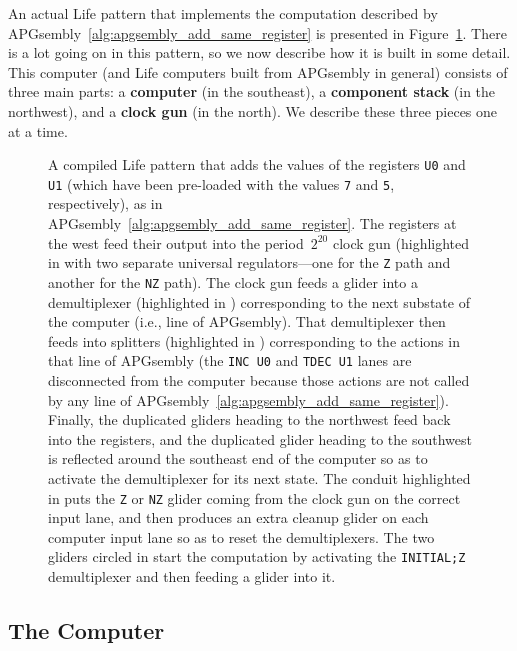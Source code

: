 An actual Life pattern that implements the computation described by APGsembly~\ref{alg:apgsembly_add_same_register} is presented in Figure~\ref{fig:add_computer}. There is a lot going on in this pattern, so we now describe how it is built in some detail. This computer (and Life computers built from APGsembly in general) consists of three main parts: a \textbf{computer} (in the southeast), a \textbf{component stack} (in the northwest), and a \textbf{clock gun} (in the north). We describe these three pieces one at a time.

\begin{figure}[!htb]
	\centering
	\caption{A compiled Life pattern that adds the values of the registers \texttt{U0} and \texttt{U1} (which have been pre-loaded with the values \texttt{7} and \texttt{5}, respectively), as in APGsembly~\ref{alg:apgsembly_add_same_register}. The registers at the west feed their output into the period~$2^{20}$ clock gun (highlighted in  with two separate universal regulators---one for the \texttt{Z} path and another for the \texttt{NZ} path). The clock gun feeds a glider into a demultiplexer (highlighted in ) corresponding to the next substate of the computer (i.e., line of APGsembly). That demultiplexer then feeds into splitters (highlighted in ) corresponding to the actions in that line of APGsembly (the \texttt{INC U0} and \texttt{TDEC U1} lanes are disconnected from the computer because those actions are not called by any line of APGsembly~\ref{alg:apgsembly_add_same_register}). Finally, the duplicated gliders heading to the northwest feed back into the registers, and the duplicated glider heading to the southwest is reflected around the southeast end of the computer so as to activate the demultiplexer for its next state. The conduit highlighted in  puts the \texttt{Z} or \texttt{NZ} glider coming from the clock gun on the correct input lane, and then produces an extra cleanup glider on each computer input lane so as to reset the demultiplexers. The two gliders circled in  start the computation by activating the \texttt{INITIAL;Z} demultiplexer and then feeding a glider into it.}\label{fig:add_computer}
\end{figure}


\subsection{The Computer}

